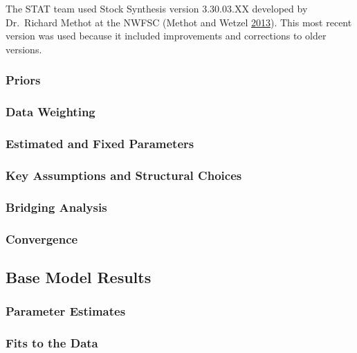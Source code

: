 \documentclass[12pt,]{article}
\begin{document}
The STAT team used Stock Synthesis version 3.30.03.XX developed by
Dr.~Richard Methot at the NWFSC (Methot and Wetzel
\protect\hyperlink{ref-methot_stock_2013}{2013}). This most recent
version was used because it included improvements and corrections to
older versions.

\subsubsection{Priors}\label{priors}

\subsubsection{Data Weighting}\label{data-weighting}

\subsubsection{Estimated and Fixed
Parameters}\label{estimated-and-fixed-parameters}

\subsubsection{Key Assumptions and Structural
Choices}\label{key-assumptions-and-structural-choices}

\subsubsection{Bridging Analysis}\label{bridging-analysis}

\subsubsection{Convergence}\label{convergence}

\subsection{Base Model Results}\label{base-model-results}

\subsubsection{Parameter Estimates}\label{parameter-estimates}

\subsubsection{Fits to the Data}\label{fits-to-the-data}
\end{document}
